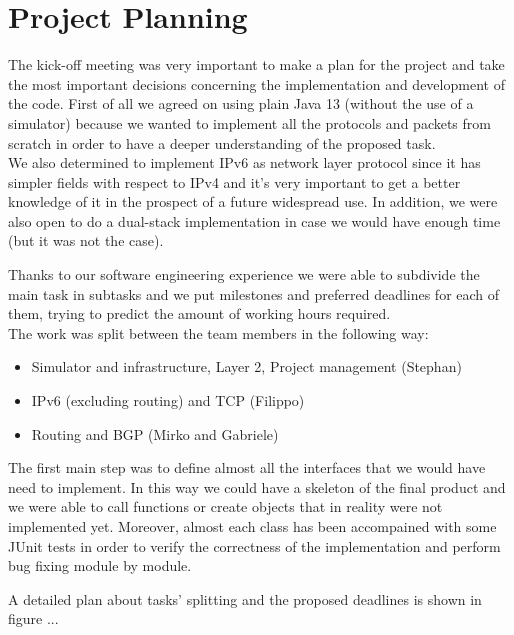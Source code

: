 \chapter{Project Planning}

The kick-off meeting was very important to make a plan for the project and take the most important
decisions concerning the implementation and development of the code.
First of all we agreed on using plain Java 13 (without the use of a simulator) because we
wanted to implement all the protocols and packets from scratch in order to have a deeper
understanding of the proposed task.\\
We also determined to implement IPv6 as network layer protocol since it has simpler fields with respect to IPv4 and
it's very important to get a better knowledge of it in the prospect of a future widespread use. In addition, we were
also open to do a dual-stack implementation in case we would have enough time (but it was not the case).

Thanks to our software engineering experience we were able to subdivide the main task in
subtasks and we put milestones and preferred deadlines for each of them, trying to predict
the amount of working hours required.\\
The work was split between the team members in the following way:
\begin{itemize}
    \item Simulator and infrastructure, Layer 2, Project management (Stephan)
    \item IPv6 (excluding routing) and TCP (Filippo)
    \item Routing and BGP (Mirko and Gabriele)
\end{itemize}

The first main step was to define almost all the interfaces that we would have need to implement.
In this way we could have a skeleton of the final product and we were able to call functions
or create objects that in reality were not implemented yet.
Moreover, almost each class has been accompained with some JUnit tests in order to verify
the correctness of the implementation and perform bug fixing module by module.

A detailed plan about tasks' splitting and the proposed deadlines is shown in figure ...


